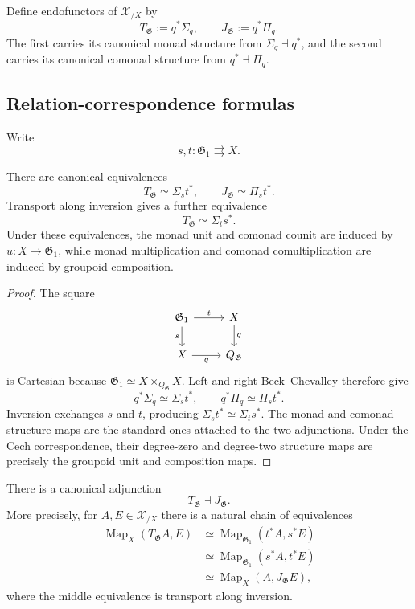 \begin{definition}
\label{def:formal-groupoid-disk-jet}
Define endofunctors of $\mathcal X_{/X}$ by
\[
    T_{\mathfrak G}
    :=
    q^*\Sigma_q,
    \qquad
    J_{\mathfrak G}
    :=
    q^*\Pi_q.
\]
The first carries its canonical monad structure from
$\Sigma_q\dashv q^*$, and the second carries its canonical comonad structure
from $q^*\dashv\Pi_q$.
\end{definition}

\subsection{Relation-correspondence formulas}

Write
\[
    s,t:\mathfrak G_1\rightrightarrows X.
\]

\begin{proposition}
\label{prop:formal-groupoid-relation-formulas}
There are canonical equivalences
\[
    T_{\mathfrak G}
    \simeq
    \Sigma_s t^*,
    \qquad
    J_{\mathfrak G}
    \simeq
    \Pi_s t^*.
\]
Transport along inversion gives a further equivalence
\[
    T_{\mathfrak G}
    \simeq
    \Sigma_t s^*.
\]
Under these equivalences, the monad unit and comonad counit are induced by
$u:X\to\mathfrak G_1$, while monad multiplication and comonad
comultiplication are induced by groupoid composition.
\end{proposition}

\begin{proof}
The square
\[
\begin{tikzcd}
\mathfrak G_1 \arrow[r,"t"] \arrow[d,"s"'] & X \arrow[d,"q"]\\
X \arrow[r,"q"'] & Q_{\mathfrak G}
\end{tikzcd}
\]
is Cartesian because
$\mathfrak G_1\simeq X\times_{Q_{\mathfrak G}}X$.  Left and right
Beck--Chevalley therefore give
\[
    q^*\Sigma_q\simeq\Sigma_s t^*,
    \qquad
    q^*\Pi_q\simeq\Pi_s t^*.
\]
Inversion exchanges $s$ and $t$, producing
$\Sigma_s t^*\simeq\Sigma_t s^*$.  The monad and comonad structure maps are
the standard ones attached to the two adjunctions.  Under the Cech
correspondence, their degree-zero and degree-two structure maps are precisely
the groupoid unit and composition maps.
\end{proof}

\begin{theorem}
\label{thm:formal-groupoid-disk-jet-adjunction}
There is a canonical adjunction
\[
    T_{\mathfrak G}
    \dashv
    J_{\mathfrak G}.
\]
More precisely, for $A,E\in\mathcal X_{/X}$ there is a natural chain of
equivalences
\[
\begin{aligned}
    \operatorname{Map}_X(T_{\mathfrak G}A,E)
    &\simeq
    \operatorname{Map}_{\mathfrak G_1}(t^*A,s^*E)
\\
    &\simeq
    \operatorname{Map}_{\mathfrak G_1}(s^*A,t^*E)
\\
    &\simeq
    \operatorname{Map}_X(A,J_{\mathfrak G}E),
\end{aligned}
\]
where the middle equivalence is transport along inversion.
\end{theorem}

